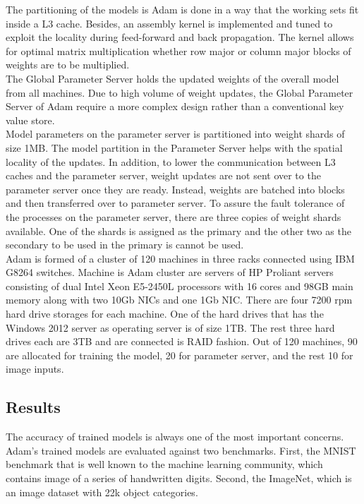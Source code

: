 \documentclass[runningheads,a4paper]{llncs}
\begin{document}
{The partitioning of the models is Adam is done in a way that the working sets fit inside a L3 cache. Besides, an assembly kernel is implemented and tuned to exploit the locality during feed-forward and back propagation. The kernel allows for optimal matrix multiplication whether row major or column major blocks of weights are to be multiplied.\\

The Global Parameter Server holds the updated weights of the overall model from all machines. Due to high volume of weight updates, the Global Parameter Server of Adam require a more complex design rather than a conventional key value store.\\

Model parameters on the parameter server is partitioned into weight shards of size 1MB. The model partition in the Parameter Server helps with the spatial locality of the updates. In addition, to lower the communication between L3 caches and the parameter server, weight updates are not sent over to the parameter server once they are ready. Instead, weights are batched into blocks and then transferred over to parameter server. To assure the fault tolerance of the processes on the parameter server, there are three copies of weight shards available. One of the shards is assigned as the primary and the other two as the secondary to be used in the primary is cannot be used.\\

Adam is formed of a cluster of 120 machines in three racks connected using IBM G8264 switches. Machine is Adam cluster are servers of HP Proliant servers consisting of dual Intel Xeon E5-2450L processors with 16 cores and 98GB main memory along with two 10Gb NICs and one 1Gb NIC. There are four 7200 rpm hard drive storages for each machine. One of the hard drives that has the Windows 2012 server as operating server is of size 1TB. The rest three hard drives each are 3TB and are connected is RAID fashion. Out of 120 machines, 90 are allocated for training the model, 20 for parameter server, and the rest 10 for image inputs.

\subsection*{Results}

The accuracy of trained models is always one of the most important concerns. Adam's trained models are evaluated against two benchmarks. First, the MNIST benchmark that is well known to the machine learning community, which contains image of a series of handwritten digits. Second, the ImageNet, which is an image dataset with 22k object categories.\\

}
\end{document}
